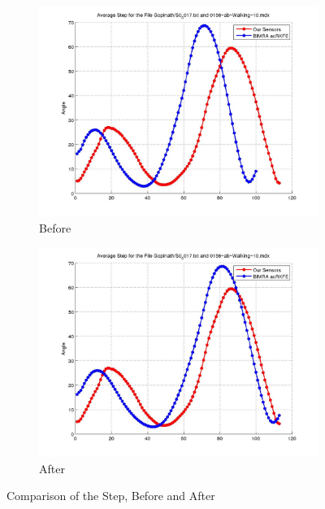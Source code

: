 \documentclass[12pt]{article}
\begin{document}
\begin{figure}[h]%

\begin{subfigure}[!htb]{2cm}
\hspace*{-2cm} \includegraphics[scale=.22]{S0_0017_before.jpg}
\caption{Before}
\end{subfigure}
\hfill\hfill
\begin{subfigure}[h]{0.4\textwidth}
\hspace*{-2cm} \includegraphics[scale=.22]{S0_0017_after.jpg}
\caption{After}
\end{subfigure}%

\caption[Hello]{Comparison of the Step, Before and After}
\end{figure}
\end{document}
